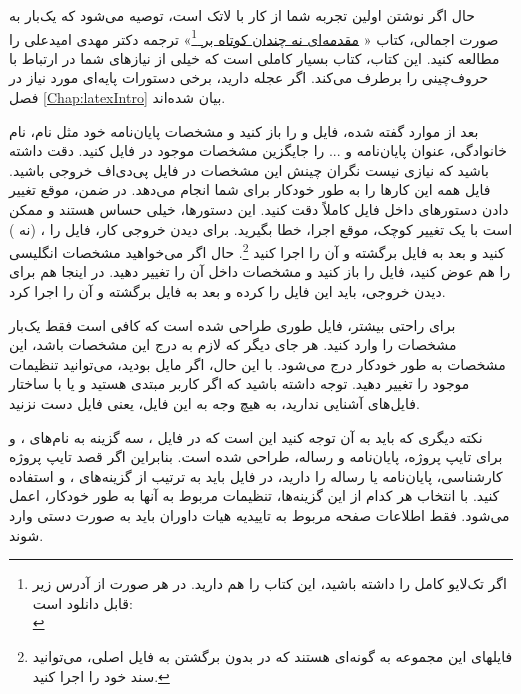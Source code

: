  حال اگر نوشتن \پ اولین تجربه شما از کار با لاتک است، توصیه می‌شود که یک‌بار به صورت اجمالی، کتاب «%
\href{http://www.tug.ctan.org/tex-archive/info/lshort/persian/lshort.pdf}{مقدمه‌ای نه چندان کوتاه بر
\lr{\LaTeXe}}\footnote{اگر تک‌لایو کامل را داشته باشید، این کتاب را هم دارید. در هر صورت از آدرس زیر قابل دانلود است:\\
}»
   ترجمه دکتر مهدی امیدعلی را مطالعه کنید. این کتاب، کتاب بسیار کاملی است که خیلی از نیازهای شما در ارتباط با حروف‌چینی را برطرف می‌کند.
اگر عجله دارید، برخی دستورات پایه‌ای مورد نیاز در فصل \ref{Chap:latexIntro} بیان شده‌اند.
 
 
بعد از موارد گفته شده، فایل 
و
را باز کنید و مشخصات پایان‌نامه خود مثل نام، نام خانوادگی، عنوان پایان‌نامه و ... را جایگزین مشخصات موجود در فایل
 کنید. دقت داشته باشید که نیازی نیست 
نگران چینش این مشخصات در فایل پی‌دی‌اف خروجی باشید. فایل 
همه این کارها را به طور خودکار برای شما انجام می‌دهد. در ضمن، موقع تغییر دادن دستورهای داخل فایل
 کاملاً دقت کنید. این دستورها، خیلی حساس هستند و ممکن است با یک تغییر کوچک، موقع اجرا، خطا بگیرید. برای دیدن خروجی کار، فایل 
 را 
، 
(نه 
)
کنید و بعد به فایل 
برگشته و آن را اجرا کنید
\footnote{فایلهای این مجموعه به گونه‌ای هستند که در   بدون برگشتن به فایل اصلی، می‌توانید سند خود را اجرا کنید. }.
 حال اگر می‌خواهید مشخصات انگلیسی \پ را هم عوض کنید، فایل 
را باز کنید و مشخصات داخل آن را تغییر دهید.%
 در اینجا هم برای دیدن خروجی، باید این فایل را 
کرده و بعد به فایل 
برگشته و آن را اجرا کرد.

برای راحتی بیشتر، 
فایل 
طوری طراحی شده است که کافی است فقط  یک‌بار مشخصات \پ  را وارد کنید. هر جای دیگر که لازم به درج این مشخصات باشد، این مشخصات به طور خودکار درج می‌شود. با این حال، اگر مایل بودید، می‌توانید تنظیمات موجود را تغییر دهید. توجه داشته باشید که اگر کاربر مبتدی هستید و یا با ساختار فایل‌های  
 آشنایی ندارید، به هیچ وجه به این فایل، یعنی فایل 
دست نزنید.

نکته دیگری که باید به آن توجه کنید این است که در فایل 
،
سه گزینه به نام‌های
،
و
برای تایپ پروژه، پایان‌نامه و رساله،
طراحی شده است. بنابراین اگر قصد تایپ پروژه کارشناسی، پایان‌نامه یا رساله را دارید، 
 در فایل 
باید به ترتیب از گزینه‌های
،
و
استفاده کنید. با انتخاب هر کدام از این گزینه‌ها، تنظیمات مربوط به آنها به طور خودکار، اعمل می‌شود.    
فقط اطلاعات صفحه مربوط به تاییدیه هیات داوران باید به صورت دستی وارد شوند.


